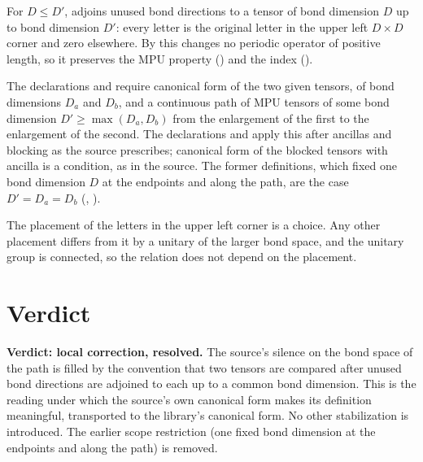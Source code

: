 \documentclass{article}
\begin{document}
For $D\le D'$,  adjoins unused bond directions to a
tensor of bond dimension $D$ up to bond dimension $D'$: every letter is the
original letter in the upper left $D\times D$ corner and zero elsewhere. By
 this changes no periodic operator of positive
length, so it preserves the MPU property ()
and the index ().

The declarations  and
 require canonical form of
the two given tensors, of bond dimensions $D_a$ and $D_b$, and a continuous
path of MPU tensors of some bond dimension $D'\ge\max(D_a,D_b)$ from the
enlargement of the first to the enlargement of the second. The declarations
 and 
apply this after ancillas and blocking as the source prescribes; canonical
form of the blocked tensors with ancilla is a condition, as in the source.
The former definitions, which fixed one bond dimension $D$ at the endpoints
and along the path, are the case $D'=D_a=D_b$
(,
).

The placement of the letters in the upper left corner is a choice. Any other
placement differs from it by a unitary of the larger bond space, and the
unitary group is connected, so the relation does not depend on the placement.

\section{Verdict}

\textbf{Verdict: local correction, resolved.} The source's silence on the
bond space of the path is filled by the convention that two tensors are
compared after unused bond directions are adjoined to each up to a common
bond dimension. This is the reading under which the source's own canonical
form makes its definition meaningful, transported to the library's canonical
form. No other stabilization is introduced. The earlier scope restriction
(one fixed bond dimension at the endpoints and along the path) is removed.



\end{document}
